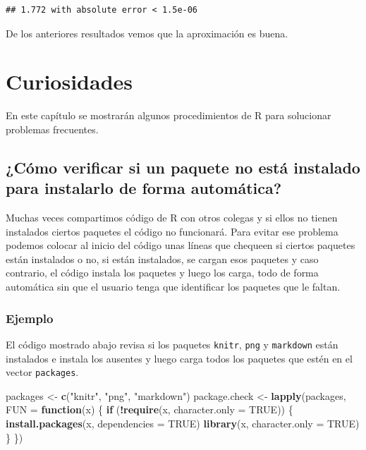 \documentclass[10pt,]{krantz}
\makeatletter
\newenvironment{Shaded}{\begin{snugshade}}{\end{snugshade}}
\newcommand{\KeywordTok}[1]{\textcolor[rgb]{0.13,0.29,0.53}{\textbf{#1}}}
\newcommand{\DataTypeTok}[1]{\textcolor[rgb]{0.13,0.29,0.53}{#1}}
\newcommand{\StringTok}[1]{\textcolor[rgb]{0.31,0.60,0.02}{#1}}
\newcommand{\OtherTok}[1]{\textcolor[rgb]{0.56,0.35,0.01}{#1}}
\newcommand{\ControlFlowTok}[1]{\textcolor[rgb]{0.13,0.29,0.53}{\textbf{#1}}}
\newcommand{\OperatorTok}[1]{\textcolor[rgb]{0.81,0.36,0.00}{\textbf{#1}}}
\newcommand{\NormalTok}[1]{#1}
\let\proglang=\textsf
\newenvironment{kframe}{%
\medskip{}
\setlength{\fboxsep}{.8em}
 \def\at@end@of@kframe{}%
 \ifinner\ifhmode%
  \def\at@end@of@kframe{\end{minipage}}%
  \begin{minipage}{\columnwidth}%
 \fi\fi%
 \def\FrameCommand##1{\hskip\@totalleftmargin \hskip-\fboxsep
 \colorbox{shadecolor}{##1}\hskip-\fboxsep
     \hskip-\linewidth \hskip-\@totalleftmargin \hskip\columnwidth}%
 \MakeFramed {\advance\hsize-\width
   \@totalleftmargin\z@ \linewidth\hsize
   \@setminipage}}%
 {\par\unskip\endMakeFramed%
 \at@end@of@kframe}
\renewenvironment{Shaded}{\begin{kframe}}{\end{kframe}}
\makeatother
\begin{document}
\begin{verbatim}
## 1.772 with absolute error < 1.5e-06
\end{verbatim}

De los anteriores resultados vemos que la aproximación es buena.

\chapter{\texorpdfstring{Curiosidades
\label{curio}}{Curiosidades }}\label{curiosidades}

En este capítulo se mostrarán algunos procedimientos de \proglang{R}
para solucionar problemas frecuentes.

\section{¿Cómo verificar si un paquete no está instalado para instalarlo
de forma
automática?}\label{como-verificar-si-un-paquete-no-esta-instalado-para-instalarlo-de-forma-automatica}

Muchas veces compartimos código de \proglang{R} con otros colegas y si
ellos no tienen instalados ciertos paquetes el código no funcionará.
Para evitar ese problema podemos colocar al inicio del código unas
líneas que chequeen si ciertos paquetes están instalados o no, si están
instalados, se cargan esos paquetes y caso contrario, el código instala
los paquetes y luego los carga, todo de forma automática sin que el
usuario tenga que identificar los paquetes que le faltan.

\subsection*{Ejemplo}\label{ejemplo-75}


El código mostrado abajo revisa si los paquetes \texttt{knitr},
\texttt{png} y \texttt{markdown} están instalados e instala los ausentes
y luego carga todos los paquetes que estén en el vector
\texttt{packages}.

\begin{Shaded}
\begin{Highlighting}[]
\NormalTok{packages <-}\StringTok{  }\KeywordTok{c}\NormalTok{(}\StringTok{"knitr"}\NormalTok{, }\StringTok{"png"}\NormalTok{, }\StringTok{"markdown"}\NormalTok{)}
\NormalTok{package.check <-}\StringTok{ }\KeywordTok{lapply}\NormalTok{(packages, }\DataTypeTok{FUN =} \ControlFlowTok{function}\NormalTok{(x) \{}
  \ControlFlowTok{if}\NormalTok{ (}\OperatorTok{!}\KeywordTok{require}\NormalTok{(x, }\DataTypeTok{character.only =} \OtherTok{TRUE}\NormalTok{)) \{}
    \KeywordTok{install.packages}\NormalTok{(x, }\DataTypeTok{dependencies =} \OtherTok{TRUE}\NormalTok{)}
    \KeywordTok{library}\NormalTok{(x, }\DataTypeTok{character.only =} \OtherTok{TRUE}\NormalTok{)}
\NormalTok{  \}}
\NormalTok{\})}
\end{Highlighting}
\end{Shaded}



\backmatter
\printindex
\end{document}
